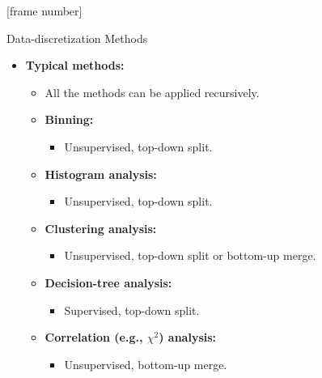 \documentclass[aspectratio=169,t]{beamer}
\begin{document}
  {
    [frame number]
    \begin{frame}{Data-discretization Methods}
    \begin{itemize}
      \item \textbf{Typical methods:}
      \begin{itemize}
        \item All the methods can be applied recursively.
        \item \textbf{Binning:}
              \begin{itemize}
                \item Unsupervised, top-down split.
              \end{itemize}
        \item \textbf{Histogram analysis:}
              \begin{itemize}
                \item Unsupervised, top-down split.
              \end{itemize}
        \item \textbf{Clustering analysis:}
              \begin{itemize}
                \item Unsupervised, top-down split or bottom-up merge.
              \end{itemize}
        \item \textbf{Decision-tree analysis:}
              \begin{itemize}
                \item Supervised, top-down split.
              \end{itemize}
        \item \textbf{Correlation (e.g., $\chi^2$) analysis:}
              \begin{itemize}
                \item Unsupervised, bottom-up merge.
              \end{itemize}
      \end{itemize}
    \end{itemize}
    \end{frame}
  }
\end{document}
